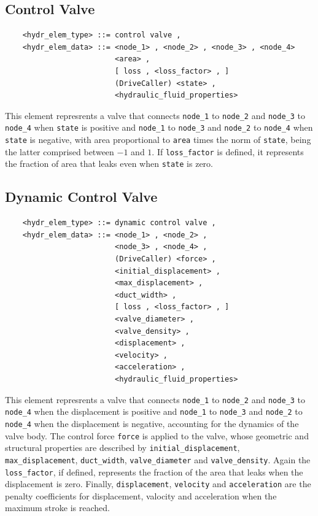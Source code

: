 \subsection{Control Valve}
\begin{verbatim}
    <hydr_elem_type> ::= control valve ,
    <hydr_elem_data> ::= <node_1> , <node_2> , <node_3> , <node_4>
                         <area> ,
                         [ loss , <loss_factor> , ]
                         (DriveCaller) <state> ,
                         <hydraulic_fluid_properties>
\end{verbatim}
This element represrents a valve that connects
\texttt{node\_1} to \texttt{node\_2} and \texttt{node\_3} to \texttt{node\_4}
when \texttt{state} is positive and \texttt{node\_1} to \texttt{node\_3}
and \texttt{node\_2} to \texttt{node\_4} when \texttt{state} is negative,
with area proportional to \texttt{area} times the norm of \texttt{state}, 
being the latter comprised between $-1$ and $1$.
If \texttt{loss\_factor} is defined, it represents the fraction
of area that leaks even when \texttt{state} is zero.



\subsection{Dynamic Control Valve}\label{sec:DYNAMIC_CONTROL_VALVE}
\begin{verbatim}
    <hydr_elem_type> ::= dynamic control valve ,
    <hydr_elem_data> ::= <node_1> , <node_2> ,
                         <node_3> , <node_4> ,
                         (DriveCaller) <force> ,
                         <initial_displacement> ,
                         <max_displacement> ,
                         <duct_width> ,
                         [ loss , <loss_factor> , ]
                         <valve_diameter> ,
                         <valve_density> ,
                         <displacement> ,
                         <velocity> ,
                         <acceleration> ,
                         <hydraulic_fluid_properties>
\end{verbatim}
This element represrents a valve that connects
\texttt{node\_1} to \texttt{node\_2} and \texttt{node\_3} to \texttt{node\_4}
when the displacement is positive and \texttt{node\_1} to \texttt{node\_3}
and \texttt{node\_2} to \texttt{node\_4} when the displacement is negative,
accounting for the dynamics of the valve body.
The control force \texttt{force} is applied to the valve, whose 
geometric and structural properties are described by 
\texttt{initial\_displacement}, \texttt{max\_displacement},
\texttt{duct\_width}, \texttt{valve\_diameter} and \texttt{valve\_density}.
Again the \texttt{loss\_factor}, if defined, represents the fraction
of the area that leaks when the displacement is zero.
Finally, \texttt{displacement}, \texttt{velocity} and \texttt{acceleration}
are the penalty coefficients for displacement, valocity and acceleration
when the maximum stroke is reached.




